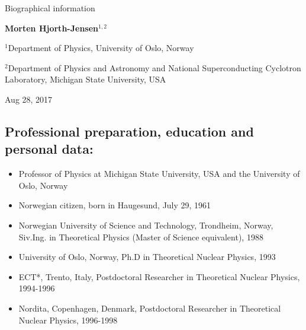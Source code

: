 \documentclass[a4wide,10pt]{article}
\begin{document}
\begin{center}
{\LARGE\bf
\begin{spacing}{1.25}
Biographical  information
\end{spacing}
}
\end{center}


\begin{center}
{\bf Morten Hjorth-Jensen${}^{1, 2}$} \\ [0mm]
\end{center}

\begin{center}
\centerline{{\small ${}^1$Department of Physics, University of Oslo, Norway}}
\centerline{{\small ${}^2$Department of Physics and Astronomy and National Superconducting Cyclotron Laboratory, Michigan State University, USA}}
\end{center}
    

\begin{center}
Aug 28, 2017
\end{center}

\vspace{1cm}


\subsection*{Professional preparation, education  and personal data:}

\begin{itemize}
\item Professor of Physics at Michigan State University, USA and the University of Oslo, Norway

\item Norwegian citizen, born in Haugesund, July 29, 1961

\item Norwegian University of Science and Technology, Trondheim, Norway,  Siv.Ing. in Theoretical Physics (Master of Science equivalent),  1988 

\item University of Oslo, Norway,  Ph.D in Theoretical Nuclear Physics, 1993

\item ECT*, Trento, Italy,  Postdoctoral Researcher in Theoretical Nuclear Physics,  1994-1996

\item Nordita, Copenhagen, Denmark, Postdoctoral Researcher in Theoretical Nuclear Physics, 1996-1998
\end{itemize}
\end{document}
